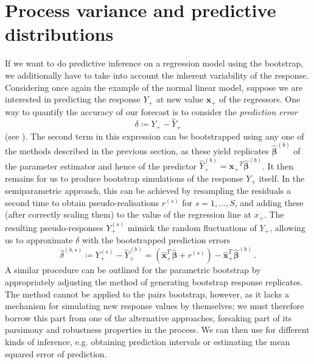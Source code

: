 \documentclass[a4paper]{book}
\begin{document}
\section{Process variance and predictive distributions} \label{sec:boot-proc}

If we want to do predictive inference on a regression model using the bootstrap, we additionally have to take into account the inherent variability of the response. Considering once again the example of the normal linear model, suppose we are interested in predicting the response $Y_+$ at new value $\mathbf{x_+}$ of the regressors. One way to quantify the accuracy of our forecast is to consider the \emph{prediction error}
\begin{equation}
  \delta \coloneqq Y_+ - \widehat{Y}_+
\end{equation}
(see \cite[Algorithm 6.4]{davison}). The second term in this expression can be bootstrapped using any one of the methods described in the previous section, as these yield replicates $\widehat{\bm{\beta}}^{(b)}$ of the parameter estimator and hence of the predictor $\widehat{Y}^{(b)}_+ = \mathbf{x_+}^T \widehat{\bm{\beta}}^{(b)}$. It then remains for us to produce bootstrap simulations of the response $Y_+$ itself. In the semiparametric approach, this can be achieved by resampling the residuals a second time to obtain pseudo-realisations $r^{(s)}$ for $s = 1, \dots, S$, and adding these (after correctly scaling them) to the value of the regression line at $x_+$. The resulting pseudo-responses $Y^{(s)}_+$ mimick the random fluctuations of $Y_+$, allowing us to approximate $\delta$ with the bootstrapped prediction errors
\begin{equation} \label{eq:pred-error-boot}
  \widehat{\delta}^{(b, s)} \coloneqq Y^{(s)}_+ - \widehat{Y}^{(b)}_+ = (\widehat{\mathbf{x}}^T_+ \widehat{\bm{\beta}} + r^{(s)}) - \widehat{\mathbf{x}}^T_+ \widehat{\bm{\beta}}^{(b)} \,.
\end{equation}
A similar procedure can be outlined for the parametric bootstrap by appropriately adjusting the method of generating bootstrap response replicates. The method cannot be applied to the pairs bootstrap, however, as it lacks a mechanism for simulating new response values by themselves; we must therefore borrow this part from one of the alternative approaches, forsaking part of its parsimony and robustness properties in the process. We can then use  for different kinds of inference, e.g. obtaining prediction intervals or estimating the mean squared error of prediction.
\end{document}
